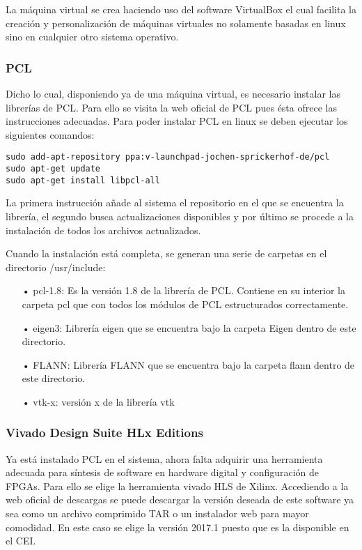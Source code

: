 La máquina virtual se crea haciendo uso del software VirtualBox el cual facilita la creación y personalización de máquinas virtuales no solamente basadas en linux sino en cualquier otro sistema operativo.


\subsubsection{PCL}
Dicho lo cual, disponiendo ya de una máquina virtual, es necesario instalar las librerías de PCL. Para ello se visita la web oficial de PCL pues ésta ofrece las instrucciones adecuadas. Para poder instalar PCL en linux se deben ejecutar los siguientes comandos:


\begin{verbatim}
sudo add-apt-repository ppa:v-launchpad-jochen-sprickerhof-de/pcl
sudo apt-get update
sudo apt-get install libpcl-all
\end{verbatim}

La primera instrucción añade al sistema el repositorio en el que se encuentra la librería, el segundo busca actualizaciones disponibles y por último se procede a la instalación de todos los archivos actualizados.

Cuando la instalación está completa, se generan una serie de carpetas en el directorio /usr/include:

\begin{itemize}
\item[•]pcl-1.8: Es la versión 1.8 de la librería de PCL. Contiene en su interior la carpeta pcl que con todos los módulos de PCL estructurados correctamente.
\item[•]eigen3: Librería eigen que se encuentra bajo la carpeta Eigen dentro de este directorio.
\item[•]FLANN: Librería FLANN que se encuentra bajo la carpeta flann dentro de este directorio.
\item[•]vtk-x: versión x de la librería vtk 
\end{itemize}

\subsubsection{Vivado Design Suite HLx Editions}
Ya está instalado PCL en el sistema, ahora falta adquirir una herramienta adecuada para síntesis de software en hardware digital y configuración de FPGAs. Para ello se elige la herramienta vivado HLS de Xilinx. Accediendo a la web oficial de descargas se puede descargar la versión deseada de este software ya sea como un archivo comprimido TAR o un instalador web para mayor comodidad. En este caso se elige la versión 2017.1 puesto que es la disponible en el CEI.

